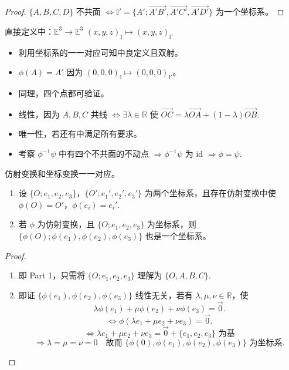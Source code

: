 \documentclass[lang=cn,10pt,thmcnt=section]{elegantbook}
\begin{document}
    \begin{proof}
    $\{A, B, C, D\}$ 不共面 $\Leftrightarrow \mathbb{I}' = \{A'; \overrightarrow{A'B'}, \overrightarrow{A'C'}, \overrightarrow{A'D'}\}$ 为一个坐标系。
    \end{proof}
    
    直接定义中：$\mathbb{E}^3 \rightarrow \mathbb{E}^3$ $(x, y, z)_{\mathbb{I}} \mapsto (x, y, z)_{\mathbb{I}'}$
    
    \begin{itemize}
        \item 利用坐标系的一一对应可知中良定义且双射。
        \item $\phi(A) = A'$ 因为 $(0,0,0)_{\mathbb{I}} \mapsto (0,0,0)_{\mathbb{I}'}$。
        \item 同理，四个点都可验证。
        \item 线性，因为 $A, B, C$ 共线 $\Leftrightarrow \exists \lambda \in \mathbb{R}$ 使 $\overrightarrow{OC} = \lambda \overrightarrow{OA} + (1-\lambda) \overrightarrow{OB}$.
        \item 唯一性，若还有中满足所有要求。
        \item 考察 $\phi^{-1}\psi$ 中有四个不共面的不动点 $\Rightarrow \phi^{-1}\psi$ 为 $\text{id}$ $\Rightarrow \phi = \psi$.
    \end{itemize}
    
    \begin{theorem}
    仿射变换和坐标变换一一对应。
    \begin{enumerate}
        \item 设 $\{O; e_1, e_2, e_3\}$，$\{O'; e_1', e_2', e_3'\}$ 为两个坐标系，且存在仿射变换中使 $\phi(O) = O'$，$\phi(e_i) = e_i'$.
        \item 若 $\phi$ 为仿射变换，且 $\{O; e_1, e_2, e_3\}$ 为坐标系，则 $\{\phi(O); \phi(e_1), \phi(e_2), \phi(e_3)\}$ 也是一个坐标系。
    \end{enumerate}
    \end{theorem}
    \begin{proof}
        \begin{enumerate}
            \item 即 Part 1，只需将 $\{O; e_1, e_2, e_3\}$ 理解为 $\{O, A, B, C\}$.
            \item 即证 $\{\phi(e_1), \phi(e_2), \phi(e_3)\}$ 线性无关，若有 $\lambda, \mu, \nu \in \mathbb{R}$，使
            \[
            \lambda \phi(e_1) + \mu \phi(e_2) + \nu \phi(e_3) = \overrightarrow{0}.
            \]
            \[
            \Leftrightarrow \phi(\lambda e_1 + \mu e_2 + \nu e_3) = \overrightarrow{0}.
            \]
            \[
            \Leftrightarrow \lambda e_1 + \mu e_2 + \nu e_3 = \overrightarrow{0} + \{e_1, e_2, e_3\} \text{ 为基}
            \]
            \[
            \Rightarrow \lambda = \mu = \nu = 0 \quad \text{故而 } \{\phi(0), \phi(e_1), \phi(e_2), \phi(e_3)\} \text{ 为坐标系}.
            \]
        \end{enumerate}
    \end{proof}
\end{document}
